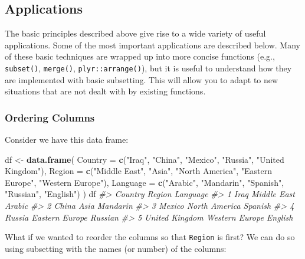 \documentclass[]{book}
\newenvironment{Shaded}{\begin{snugshade}}{\end{snugshade}}
\newcommand{\KeywordTok}[1]{\textcolor[rgb]{0.13,0.29,0.53}{\textbf{#1}}}
\newcommand{\DataTypeTok}[1]{\textcolor[rgb]{0.13,0.29,0.53}{#1}}
\newcommand{\StringTok}[1]{\textcolor[rgb]{0.31,0.60,0.02}{#1}}
\newcommand{\CommentTok}[1]{\textcolor[rgb]{0.56,0.35,0.01}{\textit{#1}}}
\newcommand{\NormalTok}[1]{#1}
\begin{document}
\subsection{Applications}\label{applications}

The basic principles described above give rise to a wide variety of
useful applications. Some of the most important applications are
described below. Many of these basic techniques are wrapped up into more
concise functions (e.g., \texttt{subset()}, \texttt{merge()},
\texttt{plyr::arrange()}), but it is useful to understand how they are
implemented with basic subsetting. This will allow you to adapt to new
situations that are not dealt with by existing functions.

\subsubsection*{Ordering Columns}\label{ordering-columns}

Consider we have this data frame:

\begin{Shaded}
\begin{Highlighting}[]
\NormalTok{df <-}\StringTok{ }\KeywordTok{data.frame}\NormalTok{(}
  \DataTypeTok{Country =} \KeywordTok{c}\NormalTok{(}\StringTok{"Iraq"}\NormalTok{, }\StringTok{"China"}\NormalTok{, }\StringTok{"Mexico"}\NormalTok{, }\StringTok{"Russia"}\NormalTok{, }\StringTok{"United Kingdom"}\NormalTok{),}
  \DataTypeTok{Region =} \KeywordTok{c}\NormalTok{(}\StringTok{"Middle East"}\NormalTok{, }\StringTok{"Asia"}\NormalTok{, }\StringTok{"North America"}\NormalTok{, }\StringTok{"Eastern Europe"}\NormalTok{, }\StringTok{"Western Europe"}\NormalTok{),}
  \DataTypeTok{Language =} \KeywordTok{c}\NormalTok{(}\StringTok{"Arabic"}\NormalTok{, }\StringTok{"Mandarin"}\NormalTok{, }\StringTok{"Spanish"}\NormalTok{, }\StringTok{"Russian"}\NormalTok{, }\StringTok{"English"}\NormalTok{)}
\NormalTok{)}
\NormalTok{df}
\CommentTok{#>          Country         Region Language}
\CommentTok{#> 1           Iraq    Middle East   Arabic}
\CommentTok{#> 2          China           Asia Mandarin}
\CommentTok{#> 3         Mexico  North America  Spanish}
\CommentTok{#> 4         Russia Eastern Europe  Russian}
\CommentTok{#> 5 United Kingdom Western Europe  English}
\end{Highlighting}
\end{Shaded}

What if we wanted to reorder the columns so that \texttt{Region} is
first? We can do so using subsetting with the names (or number) of the
columns:
\end{document}
